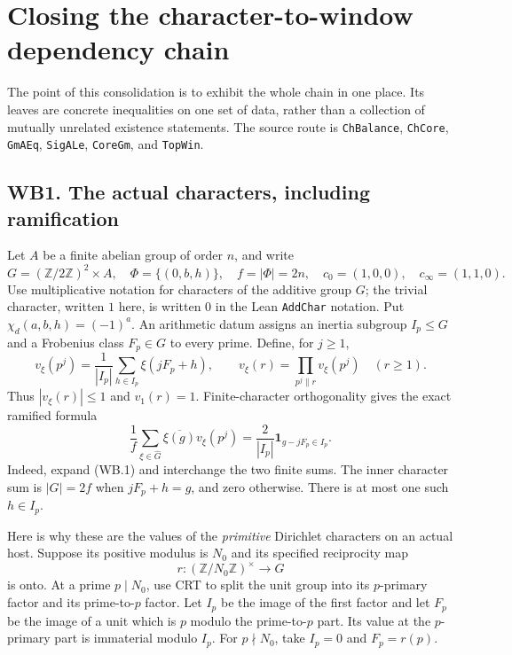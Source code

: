 \section{Closing the character-to-window dependency chain}
\label{sec:window-bridge}


The point of this consolidation is to exhibit the whole chain in one
place. Its leaves are concrete inequalities on one set of data, rather
than a collection of mutually unrelated existence statements. The
source route is \texttt{ChBalance}, \texttt{ChCore}, \texttt{GmAEq},
\texttt{SigALe}, \texttt{CoreGm}, and \texttt{TopWin}.

\subsection{WB1. The actual characters, including ramification}

Let $A$ be a finite abelian group of order $n$, and write
\[
 G=(\mathbb Z/2\mathbb Z)^2\times A,\quad
 \Phi=\{(0,b,h)\},\quad f=|\Phi|=2n,\quad
 c_0=(1,0,0),\quad c_\infty=(1,1,0).
\]
Use multiplicative notation for characters of the additive group $G$;
the trivial character, written $1$ here, is written $0$ in the Lean
\texttt{AddChar} notation. Put $\chi_d(a,b,h)=(-1)^a$.
An arithmetic datum assigns an inertia subgroup $I_p\le G$ and a
Frobenius class $F_p\in G$ to every prime. Define, for $j\ge1$,
\[
 v_\xi(p^j)=\frac1{|I_p|}\sum_{h\in I_p}\xi(jF_p+h),
 \qquad
 v_\xi(r)=\prod_{p^j\parallel r}v_\xi(p^j)\quad(r\ge1).
 \tag{WB.1}
\]
Thus $|v_\xi(r)|\le1$ and $v_1(r)=1$. Finite-character
orthogonality gives the exact ramified formula
\[
 \frac1f\sum_{\xi\in\widehat G}\overline{\xi(g)}v_\xi(p^j)
 =\frac{2}{|I_p|}\mathbf1_{g-jF_p\in I_p}.
 \tag{WB.2}
\]
Indeed, expand (WB.1) and interchange the two finite sums. The inner
character sum is $|G|=2f$ when $jF_p+h=g$, and zero otherwise.
There is at most one such $h\in I_p$.

Here is why these are the values of the \emph{primitive} Dirichlet
characters on an actual host. Suppose its positive modulus is $N_0$
and its specified reciprocity map
\[
 r:(\mathbb Z/N_0\mathbb Z)^\times\longrightarrow G
\]
is onto. At a prime $p\mid N_0$, use CRT to split the unit group
into its $p$-primary factor and its prime-to-$p$ factor. Let $I_p$
be the image of the first factor and let $F_p$ be the image of a unit
which is $p$ modulo the prime-to-$p$ part. Its value at the
$p$-primary part is immaterial modulo $I_p$. For $p\nmid N_0$,
take $I_p=0$ and $F_p=r(p)$.

